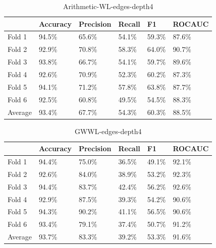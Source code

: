 \documentclass{IEEEtran}
\begin{document}
\begin{table}[!ht]
    \centering
    \begin{tabular}{l||llll|l}
        \textbf{} & \textbf{Accuracy} & \textbf{Precision} & \textbf{Recall} & \textbf{F1} & \textbf{ROCAUC} \\
        \hline \hline
        Fold 1    & 94.5\%            & 65.6\%             & 54.1\%          & 59.3\%      & 87.6\%          \\
        Fold 2    & 92.9\%            & 70.8\%             & 58.3\%          & 64.0\%      & 90.7\%          \\
        Fold 3    & 93.8\%            & 66.7\%             & 54.1\%          & 59.7\%      & 89.6\%          \\
        Fold 4    & 92.6\%            & 70.9\%             & 52.3\%          & 60.2\%      & 87.3\%          \\
        Fold 5    & 94.1\%            & 71.2\%             & 57.8\%          & 63.8\%      & 87.7\%          \\
        Fold 6    & 92.5\%            & 60.8\%             & 49.5\%          & 54.5\%      & 88.3\%          \\
        \hline
        Average   & 93.4\%            & 67.7\%             & 54.3\%          & 60.3\%      & 88.5\%          \\
    \end{tabular}
    \caption{Arithmetic-WL-edges-depth4}
\end{table}

\begin{table}
    \centering
    \begin{tabular}{l||llll|l}
        \textbf{} & \textbf{Accuracy} & \textbf{Precision} & \textbf{Recall} & \textbf{F1} & \textbf{ROCAUC} \\
        \hline \hline
        Fold 1    & 94.4\%            & 75.0\%             & 36.5\%          & 49.1\%      & 92.1\%          \\
        Fold 2    & 92.6\%            & 84.0\%             & 38.9\%          & 53.2\%      & 92.3\%          \\
        Fold 3    & 94.4\%            & 83.7\%             & 42.4\%          & 56.2\%      & 92.6\%          \\
        Fold 4    & 92.9\%            & 87.5\%             & 39.3\%          & 54.2\%      & 90.6\%          \\
        Fold 5    & 94.3\%            & 90.2\%             & 41.1\%          & 56.5\%      & 90.6\%          \\
        Fold 6    & 93.4\%            & 79.1\%             & 37.4\%          & 50.7\%      & 91.2\%          \\
        \hline
        Average   & 93.7\%            & 83.3\%             & 39.2\%          & 53.3\%      & 91.6\%          \\
    \end{tabular}
    \caption{GWWL-edges-depth4}
\end{table}
\end{document}
